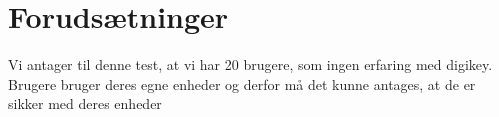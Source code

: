 \documentclass[12pt]{article}
\numberwithin{listing}{section}
\begin{document}

\clearpage\maketitle
\thispagestyle{empty}

\newpage


\thispagestyle{empty}

\pagestyle{plain}
\setcounter{page}{1}

\section*{Forudsætninger}
Vi antager til denne test, at vi har 20 brugere, som ingen erfaring med digikey.\\
Brugere bruger deres egne enheder og derfor må det kunne antages, at de er sikker med deres enheder
\end{document}
